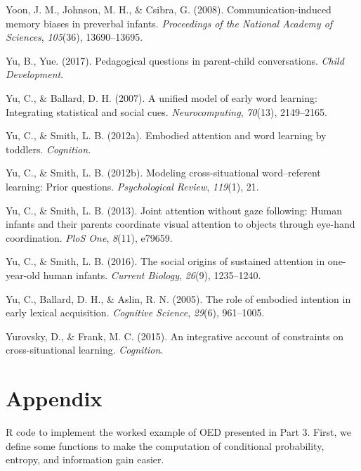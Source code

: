 \documentclass[english,floatsintext,man]{apa6}
\theoremstyle{definition}
\theoremstyle{definition}
\theoremstyle{definition}
\theoremstyle{remark}
\begin{document}
\hypertarget{ref-yoon2008communication}{}
Yoon, J. M., Johnson, M. H., \& Csibra, G. (2008). Communication-induced
memory biases in preverbal infants. \emph{Proceedings of the National
Academy of Sciences}, \emph{105}(36), 13690--13695.

\hypertarget{ref-yu2017peagogical}{}
Yu, B., Yue. (2017). Pedagogical questions in parent-child
conversations. \emph{Child Development}.

\hypertarget{ref-yu2007unified}{}
Yu, C., \& Ballard, D. H. (2007). A unified model of early word
learning: Integrating statistical and social cues.
\emph{Neurocomputing}, \emph{70}(13), 2149--2165.

\hypertarget{ref-yu2012embodied}{}
Yu, C., \& Smith, L. B. (2012a). Embodied attention and word learning by
toddlers. \emph{Cognition}.

\hypertarget{ref-yu2012modeling}{}
Yu, C., \& Smith, L. B. (2012b). Modeling cross-situational
word--referent learning: Prior questions. \emph{Psychological Review},
\emph{119}(1), 21.

\hypertarget{ref-yu2013joint}{}
Yu, C., \& Smith, L. B. (2013). Joint attention without gaze following:
Human infants and their parents coordinate visual attention to objects
through eye-hand coordination. \emph{PloS One}, \emph{8}(11), e79659.

\hypertarget{ref-yu2016social}{}
Yu, C., \& Smith, L. B. (2016). The social origins of sustained
attention in one-year-old human infants. \emph{Current Biology},
\emph{26}(9), 1235--1240.

\hypertarget{ref-yu2005role}{}
Yu, C., Ballard, D. H., \& Aslin, R. N. (2005). The role of embodied
intention in early lexical acquisition. \emph{Cognitive Science},
\emph{29}(6), 961--1005.

\hypertarget{ref-yurovsky2014algorithmic}{}
Yurovsky, D., \& Frank, M. C. (2015). An integrative account of
constraints on cross-situational learning. \emph{Cognition}.

\newpage

\hypertarget{app}{\section{Appendix}\label{app}}

\setlength{\parindent}{0in} \setlength{\leftskip}{0in}

R code to implement the worked example of OED presented in Part 3.
First, we define some functions to make the computation of conditional
probability, entropy, and information gain easier.
\end{document}
